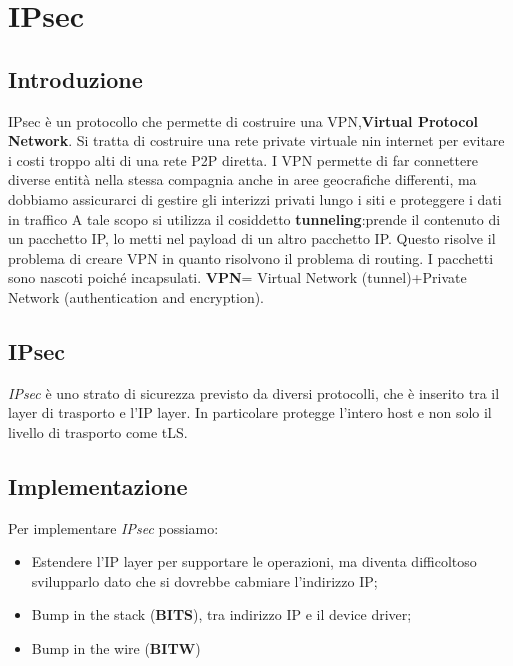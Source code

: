 \documentclass{book}
\theoremstyle{remark}
\begin{document}
\chapter{IPsec}
\section{Introduzione}
IPsec è un protocollo che permette di costruire una VPN,\textbf{Virtual Protocol Network}\@. Si tratta di costruire una rete private virtuale nin internet per evitare i costi troppo alti di una rete P2P diretta\@.
I VPN permette di far connettere diverse entità nella stessa compagnia anche in aree geocrafiche differenti, ma dobbiamo assicurarci di gestire gli interizzi privati lungo i siti e proteggere i dati in traffico A tale scopo si utilizza il cosiddetto \textbf{tunneling}:\@si prende il contenuto di un pacchetto IP, lo metti nel payload di un altro pacchetto IP\@. Questo risolve il problema di creare VPN in quanto risolvono il problema di routing\@. I pacchetti sono nascoti poiché incapsulati\@.\newline
\textbf{VPN}= Virtual Network (tunnel)+Private Network (authentication and encryption)\@.
\section{IPsec}
\emph{IPsec} è uno strato di sicurezza previsto da diversi protocolli, che è inserito tra il layer di trasporto e l'IP layer\@. In particolare protegge l'intero host e non solo il livello di trasporto come tLS\@.
\section{Implementazione}
Per implementare \emph{IPsec} possiamo:\begin{itemize}
	\item Estendere l'IP layer per supportare le operazioni, ma diventa difficoltoso svilupparlo dato che si dovrebbe cabmiare l'indirizzo IP;\@
	\item Bump in the stack (\textbf{BITS}), tra indirizzo IP e il device driver;\@
	\item Bump in the wire (\textbf{BITW})
\end{itemize}
\end{document}

